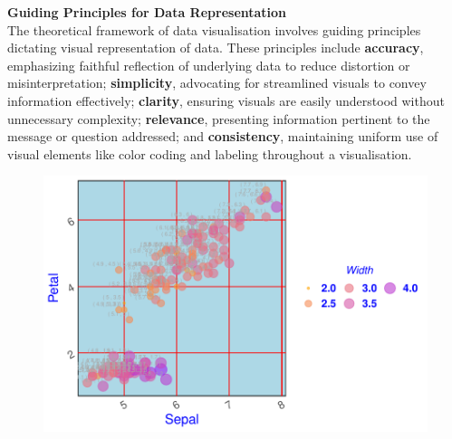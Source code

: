 \documentclass{article}\usepackage[]{graphicx}\usepackage[]{xcolor}
\newenvironment{knitrout}{}{} %
\begin{document}
\noindent \textbf{Guiding Principles for Data Representation}\\
The theoretical framework of data visualisation involves guiding principles dictating visual representation of data. These principles include \textbf{accuracy}, emphasizing faithful reflection of underlying data to reduce distortion or misinterpretation; \textbf{simplicity}, advocating for streamlined visuals to convey information effectively; \textbf{clarity}, ensuring visuals are easily understood without unnecessary complexity; \textbf{relevance}, presenting information pertinent to the message or question addressed; and \textbf{consistency}, maintaining uniform use of visual elements like color coding and labeling throughout a visualisation.\\


\begin{figure}[htbp]
  \centering
  \begin{minipage}[b]{0.45\linewidth}
\begin{knitrout}\scriptsize
{}\color{fgcolor}

{\centering \includegraphics[width=\linewidth]{figure/beamer-messygraph-1} 

}


\end{knitrout}
    \label{fig:messygraph}
  \end{minipage}
  \hfill
  \begin{minipage}[b]{0.45\linewidth}
\begin{knitrout}\scriptsize
{}\color{fgcolor}


\end{knitrout}
\end{minipage}
\end{figure}
\end{document}
